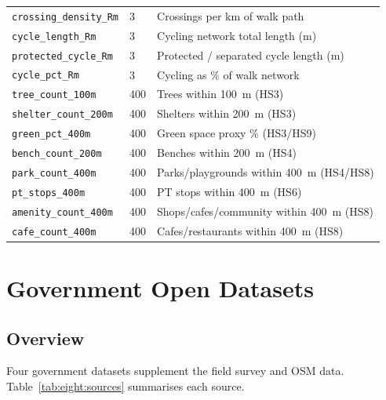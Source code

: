 \documentclass[11pt,a4paper,openany]{book}
\begin{document}
\begin{longtable}{L{5.8cm} C{1.8cm} L{5.5cm}}
\texttt{crossing\_density\_Rm}   & 3     & Crossings per km of walk path \\
\texttt{cycle\_length\_Rm}       & 3     & Cycling network total length (m) \\
\texttt{protected\_cycle\_Rm}    & 3     & Protected / separated cycle length (m) \\
\texttt{cycle\_pct\_Rm}          & 3     & Cycling as \% of walk network \\
\texttt{tree\_count\_100m}       & 400   & Trees within 100~m (HS3) \\
\texttt{shelter\_count\_200m}    & 400   & Shelters within 200~m (HS3) \\
\texttt{green\_pct\_400m}        & 400   & Green space proxy \% (HS3/HS9) \\
\texttt{bench\_count\_200m}      & 400   & Benches within 200~m (HS4) \\
\texttt{park\_count\_400m}       & 400   & Parks/playgrounds within 400~m (HS4/HS8) \\
\texttt{pt\_stops\_400m}         & 400   & PT stops within 400~m (HS6) \\
\texttt{amenity\_count\_400m}    & 400   & Shops/cafes/community within 400~m (HS8) \\
\texttt{cafe\_count\_400m}       & 400   & Cafes/restaurants within 400~m (HS8) \\
\end{longtable}

\chapter{Government Open Datasets}

\section{Overview}

Four government datasets supplement the field survey and OSM data. Table~\ref{tab:eight:sources} summarises each source.
\end{document}
